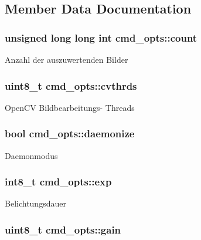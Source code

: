 \subsection{Member Data Documentation}
\hypertarget{structcmd__opts_a582f29b5e8c3328779e88bcb22ff3c2e}{
\subsubsection[{count}]{\setlength{\rightskip}{0pt plus 5cm}unsigned long long int cmd\+\_\+opts\+::count}}\label{structcmd__opts_a582f29b5e8c3328779e88bcb22ff3c2e}
Anzahl der auszuwertenden Bilder \hypertarget{structcmd__opts_a6d2fcb749257ff950fabdb000999d7f9}{
\subsubsection[{cvthrds}]{\setlength{\rightskip}{0pt plus 5cm}uint8\+\_\+t cmd\+\_\+opts\+::cvthrds}}\label{structcmd__opts_a6d2fcb749257ff950fabdb000999d7f9}
Open\+C\+V Bildbearbeitungs-\/ Threads \hypertarget{structcmd__opts_a0e94dcdbf5c755d97477c346ece96a2e}{
\subsubsection[{daemonize}]{\setlength{\rightskip}{0pt plus 5cm}bool cmd\+\_\+opts\+::daemonize}}\label{structcmd__opts_a0e94dcdbf5c755d97477c346ece96a2e}
Daemonmodus \hypertarget{structcmd__opts_aa6ef1ebf0fbaa8bd7016a8ef1a2c5ef4}{
\subsubsection[{exp}]{\setlength{\rightskip}{0pt plus 5cm}int8\+\_\+t cmd\+\_\+opts\+::exp}}\label{structcmd__opts_aa6ef1ebf0fbaa8bd7016a8ef1a2c5ef4}
Belichtungsdauer \hypertarget{structcmd__opts_a55323cae5dfbafe672e6581da99985b9}{
\subsubsection[{gain}]{\setlength{\rightskip}{0pt plus 5cm}uint8\+\_\+t cmd\+\_\+opts\+::gain}}\label{structcmd__opts_a55323cae5dfbafe672e6581da99985b9}
